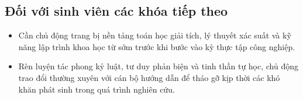 \subsection{Đối với sinh viên các khóa tiếp theo}
\begin{itemize}
    \item Cần chủ động trang bị nền tảng toán học giải tích, lý thuyết xác suất và kỹ năng lập trình khoa học từ sớm trước khi bước vào kỳ thực tập công nghiệp.
    \item Rèn luyện tác phong kỷ luật, tư duy phản biện và tinh thần tự học, chủ động trao đổi thường xuyên với cán bộ hướng dẫn để tháo gỡ kịp thời các khó khăn phát sinh trong quá trình nghiên cứu.
\end{itemize}
